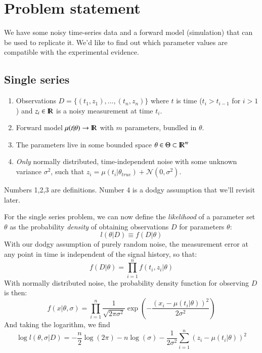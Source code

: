 \documentclass[preprint,authoryear,10pt]{elsarticle}
\newcommand\real{{\rm I\!R}}
\newcommand\normal{\mathcal{N}}
\begin{document}
%
%
%
%
\newpage
\appendix





%
%
%
%
\section{Problem statement}
We have some noisy time-series data and a forward model (simulation) that can
 be used to replicate it.
We'd like to find out which parameter values are compatible with the
 experimental evidence.

\subsection{Single series}

\begin{enumerate}
\item Observations $D = \{(t_1, z_1),...,(t_n, z_n)\}$ where $t$ is time
 ($t_i > t_{i-1}$ for $i > 1$) and $z_i\in\real$ is a noisy measurement at
 time $t_i$.
\item Forward model $\mu(t|\theta) \to \real$ with $m$ parameters, bundled in
 $\theta$.
\item The parameters live in some bounded space
 $\theta\in\Theta\subset\real^m$
\item \emph{Only} normally distributed, time-independent noise with some
 unknown variance $\sigma^2$, such that
 $z_i = \mu(t_i|\theta_{true}) + \normal(0, \sigma^2)$.
\end{enumerate}

Numbers 1,2,3 are definitions.
Number 4 is a dodgy assumption that we'll revisit later.

For the single series problem, we can now define the \emph{likelihood} of a
 parameter set $\theta$ as the probability \emph{density} of obtaining
 observations $D$ for parameters $\theta$:
\begin{equation}
l(\theta|D) \equiv f(D|\theta)
\end{equation}
With our dodgy assumption of purely random noise, the measurement error at any
 point in time is independent of the signal history, so that:
\begin{equation}
f(D|\theta) = \prod_{i=1}^{n} f(t_i,z_i|\theta)
\end{equation}
With normally distributed noise, the probability density function for
 observing $D$ is then:
\begin{equation}
f(x|\theta,\sigma) = \prod_{i=1}^{n} \frac{1}{\sqrt{2\pi\sigma^2}}
    \exp \left(
        -\frac{\left(x_i - \mu(t_i|\theta)\right)^2}{2\sigma^2}
    \right)
\end{equation}
And taking the logarithm, we find
\begin{equation}
\log l(\theta,\sigma|D) =
    - \frac{n}{2} \log(2\pi)
    - n \log(\sigma)
    - \frac{1}{2\sigma^2} \sum_{i=1}^n \left(z_i - \mu(t_i|\theta) \right)^2
\end{equation}
\end{document}
